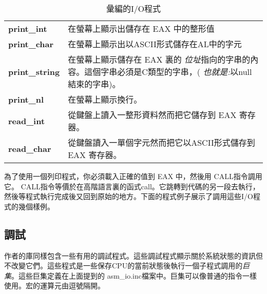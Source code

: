 \begin{table}[t]
\centering
\begin{tabular}{lp{3.5in}}
{\bf print\_int} & 在螢幕上顯示出儲存在 EAX 中的整形值\\
{\bf print\_char} & 在螢幕上顯示出以ASCII形式儲存在AL中的字元\\
{\bf print\_string} & 在螢幕上顯示儲存在 EAX 裏的{\em
位址}指向的字串的內容。這個字串必須是C類型的字串，({\em
也就是:}以null結束的字串)。 \\
{\bf print\_nl} & 在螢幕上顯示換行。 \\
{\bf read\_int} & 從鍵盤上讀入一整形資料然而把它儲存到 EAX 寄存器。 \\
{\bf read\_char} & 從鍵盤讀入一單個字元然而把它以ASCII形式儲存到 EAX
寄存器。 \\
\end{tabular}
\caption{彙編的I/O程式 \label{tab:asmio}  
  
}
\end{table}

為了使用一個列印程式，你必須載入正確的值到 EAX 中，然後用{\code
CALL}指令調用它。{\code
CALL}指令等價於在高階語言裏的函式call。它跳轉到代碼的另一段去執行，然後等程式執行完成後又回到原始的地方。下面的程式例子展示了調用這些I/O程式的幾個樣例。

\subsection{調試}

作者的庫同樣包含一些有用的調試程式。這些調試程式顯示關於系統狀態的資訊但不改變它們。這些程式是一些保存CPU的當前狀態後執行一個子程式調用的\emph{巨集}。這些巨集定義在上面提到的{\code
asm\_io.inc}檔案中。巨集可以像普通的指令一樣使用。宏的運算元由逗號隔開。

